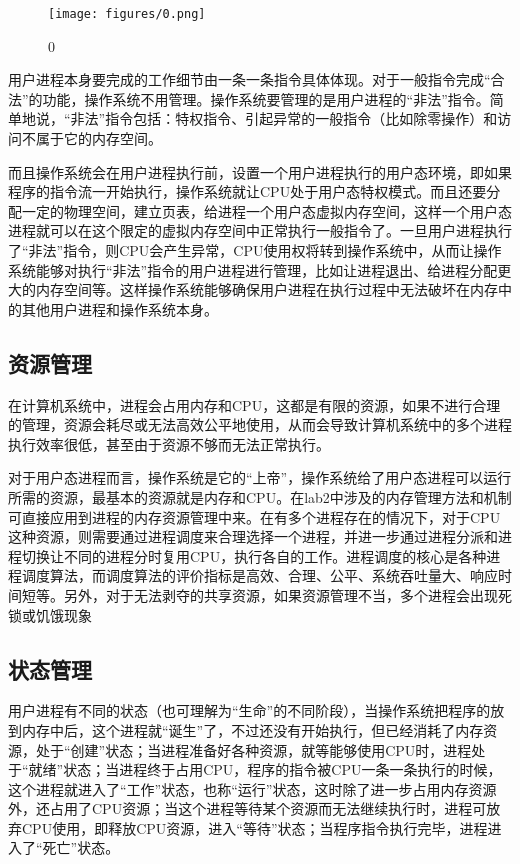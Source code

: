 \begin{figure}[htbp]
\centering
\texttt{[image: figures/0.png]}
\caption{0}
\end{figure}

用户进程本身要完成的工作细节由一条一条指令具体体现。对于一般指令完成``合法''的功能，操作系统不用管理。操作系统要管理的是用户进程的``非法''指令。简单地说，``非法''指令包括：特权指令、引起异常的一般指令（比如除零操作）和访问不属于它的内存空间。

而且操作系统会在用户进程执行前，设置一个用户进程执行的用户态环境，即如果程序的指令流一开始执行，操作系统就让CPU处于用户态特权模式。而且还要分配一定的物理空间，建立页表，给进程一个用户态虚拟内存空间，这样一个用户态进程就可以在这个限定的虚拟内存空间中正常执行一般指令了。一旦用户进程执行了``非法''指令，则CPU会产生异常，CPU使用权将转到操作系统中，从而让操作系统能够对执行``非法''指令的用户进程进行管理，比如让进程退出、给进程分配更大的内存空间等。这样操作系统能够确保用户进程在执行过程中无法破坏在内存中的其他用户进程和操作系统本身。

\subsection{资源管理}\label{ux8d44ux6e90ux7ba1ux7406}

在计算机系统中，进程会占用内存和CPU，这都是有限的资源，如果不进行合理的管理，资源会耗尽或无法高效公平地使用，从而会导致计算机系统中的多个进程执行效率很低，甚至由于资源不够而无法正常执行。

对于用户态进程而言，操作系统是它的``上帝''，操作系统给了用户态进程可以运行所需的资源，最基本的资源就是内存和CPU。在lab2中涉及的内存管理方法和机制可直接应用到进程的内存资源管理中来。在有多个进程存在的情况下，对于CPU这种资源，则需要通过进程调度来合理选择一个进程，并进一步通过进程分派和进程切换让不同的进程分时复用CPU，执行各自的工作。进程调度的核心是各种进程调度算法，而调度算法的评价指标是高效、合理、公平、系统吞吐量大、响应时间短等。另外，对于无法剥夺的共享资源，如果资源管理不当，多个进程会出现死锁或饥饿现象

\subsection{状态管理}\label{ux72b6ux6001ux7ba1ux7406}

用户进程有不同的状态（也可理解为``生命''的不同阶段），当操作系统把程序的放到内存中后，这个进程就``诞生''了，不过还没有开始执行，但已经消耗了内存资源，处于``创建''状态；当进程准备好各种资源，就等能够使用CPU时，进程处于``就绪''状态；当进程终于占用CPU，程序的指令被CPU一条一条执行的时候，这个进程就进入了``工作''状态，也称``运行''状态，这时除了进一步占用内存资源外，还占用了CPU资源；当这个进程等待某个资源而无法继续执行时，进程可放弃CPU使用，即释放CPU资源，进入``等待''状态；当程序指令执行完毕，进程进入了``死亡''状态。

